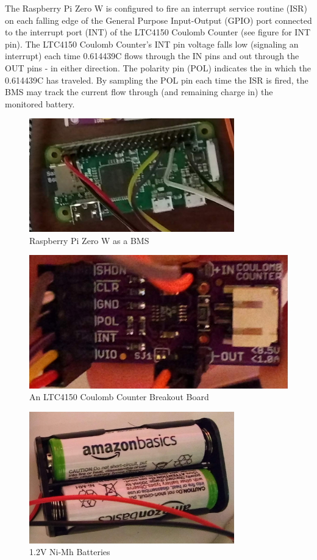 \documentclass[11pt,conference,draftcls,onecolumn]{IEEEtran}
\begin{document}
The Raspberry Pi Zero W is configured to fire an interrupt service routine (ISR) on each falling edge of the General Purpose Input-Output (GPIO) port connected to the interrupt port (INT) of the LTC4150 Coulomb Counter (see figure for INT pin).
The LTC4150 Coulomb Counter's INT pin voltage falls low (signaling an interrupt) each time 0.614439C flows through the IN pins and out through the OUT pins - in either direction.
The polarity pin (POL) indicates the in which the 0.614439C has traveled.
By sampling the POL pin each time the ISR is fired, the BMS may track the current flow through (and remaining charge in) the monitored battery. 
\begin{figure}
    \centering
    \includegraphics[width=3.5in]{img/rpi0w.png}
    \caption{Raspberry Pi Zero W as a BMS}
    \label{fig:rpi0w}
\end{figure}
\begin{figure}
    \centering
    \includegraphics[width=4.5in]{img/coulombCounter.png}
    \caption{An LTC4150 Coulomb Counter Breakout Board}
    \label{fig:coulombCounter}
\end{figure}
\begin{figure}
    \centering
    \includegraphics[width=3.5in]{img/nimhBatt.png}
    \caption{1.2V Ni-Mh Batteries}
    \label{fig:nimhBatt}
\end{figure}
\end{document}
